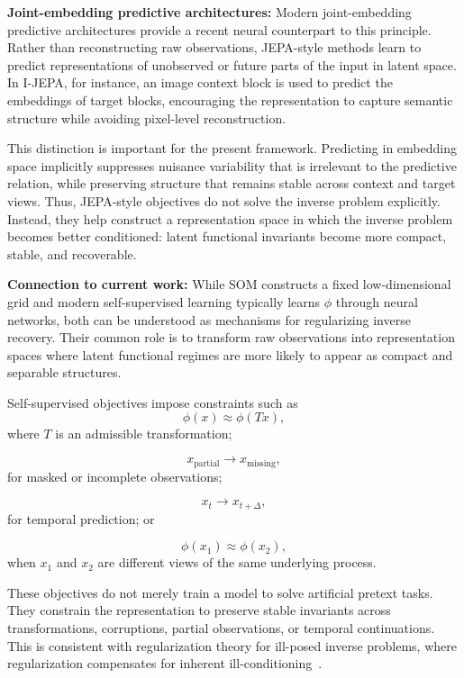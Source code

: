 \documentclass[11pt,a4paper]{article}
\begin{document}
\textbf{Joint-embedding predictive architectures:} Modern joint-embedding predictive architectures \cite{assran2023ijepa} provide a recent neural counterpart to this principle. Rather than reconstructing raw observations, JEPA-style methods learn to predict representations of unobserved or future parts of the input in latent space. In I-JEPA, for instance, an image context block is used to predict the embeddings of target blocks, encouraging the representation to capture semantic structure while avoiding pixel-level reconstruction.

This distinction is important for the present framework. Predicting in embedding space implicitly suppresses nuisance variability that is irrelevant to the predictive relation, while preserving structure that remains stable across context and target views. Thus, JEPA-style objectives do not solve the inverse problem explicitly. Instead, they help construct a representation space in which the inverse problem becomes better conditioned: latent functional invariants become more compact, stable, and recoverable.

\textbf{Connection to current work:} While SOM constructs a fixed low-dimensional grid and modern self-supervised learning typically learns $\phi$ through neural networks, both can be understood as mechanisms for regularizing inverse recovery. Their common role is to transform raw observations into representation spaces where latent functional regimes are more likely to appear as compact and separable structures.

Self-supervised objectives impose constraints such as
\begin{equation}
\phi(x) \approx \phi(Tx),
\end{equation}
where $T$ is an admissible transformation;

\begin{equation}
x_{\mathrm{partial}} \longrightarrow x_{\mathrm{missing}},
\end{equation}
for masked or incomplete observations;

\begin{equation}
x_t \longrightarrow x_{t+\Delta},
\end{equation}
for temporal prediction; or

\begin{equation}
\phi(x_1) \approx \phi(x_2),
\end{equation}
when $x_1$ and $x_2$ are different views of the same underlying process.

These objectives do not merely train a model to solve artificial pretext tasks. They constrain the representation to preserve stable invariants across transformations, corruptions, partial observations, or temporal continuations. This is consistent with regularization theory for ill-posed inverse problems, where regularization compensates for inherent ill-conditioning~\cite{tikhonov1977illPosed}.
\end{document}

